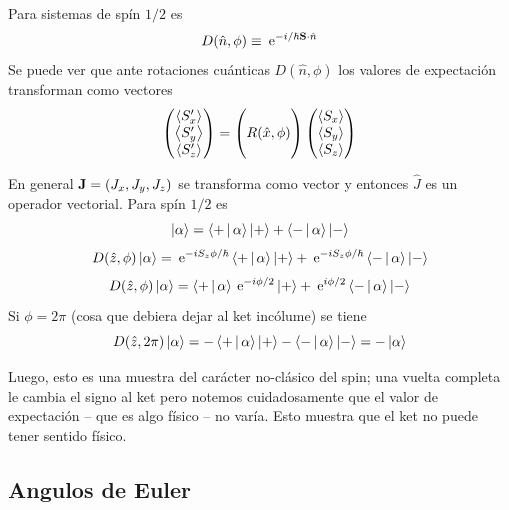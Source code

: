 \documentclass[10pt,oneside]{CBFT_book}
\begin{document}
Para sistemas de spín $1/2$ es 
\[
	D(\hat{n},\phi) \equiv \euler^{-i/\hbar \vb{S}\cdot\hat{n} }
\]
Se puede ver que ante rotaciones cuánticas $D(\hat{n},\phi)$ los valores de expectación transforman como 
vectores
\[
	\begin{pmatrix} \Braket{S_x'} \\ \Braket{S_y'} \\ \Braket{S_z'}	\end{pmatrix} =	\begin{pmatrix} 
	\\
	 R(\hat{x},\phi) \\
	 \\
	\end{pmatrix}\begin{pmatrix} \Braket{S_x} \\ \Braket{S_y} \\ \Braket{S_z} \end{pmatrix}
\]

En general $\vb{J} = (J_x, J_y, J_z)$ se transforma como vector y entonces $\hat{J}$ es un operador vectorial.
Para spín $1/2$ es
\[
	\Ket{\alpha} = \Braket{+|\alpha}\Ket{+} + \Braket{-|\alpha}\Ket{-}
\]
\[
	D(\hat{z},\phi)\Ket{\alpha} = \:\mathrm{e}^{-iS_z\phi/\hbar}\Braket{+|\alpha}\Ket{+} +
		\:\mathrm{e}^{-iS_z\phi/\hbar} \Braket{-|\alpha}\Ket{-}
\]
\[
	D(\hat{z},\phi)\Ket{\alpha} = \Braket{+|\alpha} \:\mathrm{e}^{-i\phi/2} \Ket{+} +
		\:\mathrm{e}^{i\phi/2} \Braket{-|\alpha}\Ket{-}
\]
Si $\phi=2\pi$ (cosa que debiera dejar al ket incólume) se tiene 
\[
	D(\hat{z},2\pi) \Ket{\alpha} = - \Braket{+|\alpha}\Ket{+} - \Braket{-|\alpha}\Ket{-} = -\Ket{\alpha}
\]

Luego, esto es una muestra del carácter no-clásico del spin; una vuelta completa le cambia el signo al ket 
pero notemos cuidadosamente que el valor de expectación -- que es algo físico -- no varía. Esto muestra que 
el ket no puede tener sentido físico.

\subsection{Angulos de Euler}
\end{document}
